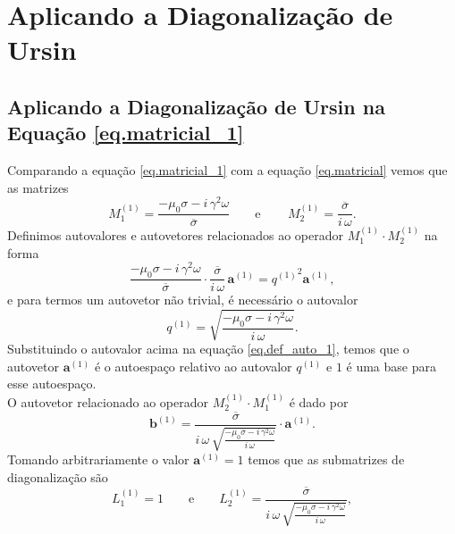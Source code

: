 \chapter{Aplicando a Diagonaliza\c{c}\~ao de Ursin}\label{sec.diagonalizacao_ursin}

   

\section{Aplicando a Diagonaliza\c{c}\~ao de Ursin na Equa\c{c}\~ao \ref{eq.matricial_1}}\label{sec.diagonalizacao_1}

Comparando a equa\c{c}\~ao \ref{eq.matricial_1} com a equa\c{c}\~ao \ref{eq.matricial} vemos que as matrizes
\begin{equation*}
M^{(1)}_1=\frac{-\mu_0\sigma-i\,\gamma^2\omega}{\overline{\sigma}}\qquad\text{e}\qquad\,M^{(1)}_2=\frac{\overline{\sigma}}{i\,\omega}.
\end{equation*}
Definimos autovalores e autovetores relacionados ao operador $M^{(1)}_1\cdot M^{(1)}_2$ na forma 
\begin{equation}\label{eq.def_auto_1}
\frac{-\mu_0\sigma-i\,\gamma^2\omega}{\overline{\sigma}}\cdot\frac{\overline{\sigma}}{i\,\omega}\,\mathbf{a}^{(1)}={q^{(1)}}^2\mathbf{a}^{(1)},
\end{equation}
e para termos um autovetor n\~ao trivial, \'e necess\'ario o autovalor
\begin{equation*}
q^{(1)}=\sqrt{\frac{-\mu_0\sigma-i\,\gamma^2\omega}{i\,\omega}}.
\end{equation*}
Substituindo o autovalor acima na equa\c{c}\~ao \ref{eq.def_auto_1}, temos que o autovetor $\mathbf{a}^{(1)}$ \'e o autoespa\c{c}o relativo ao autovalor $q^{(1)}$ e ${1}$ \'e uma base para esse autoespa\c{c}o.\\
O autovetor relacionado ao operador $M^{(1)}_2\cdot M^{(1)}_1$ \'e dado por
\begin{equation*}
\mathbf{b}^{(1)}=\frac{\overline{\sigma}}{i\,\omega\,\sqrt{\frac{-\mu_0\sigma-i\,\gamma^2\omega}{i\,\omega}}}\cdot\mathbf{a}^{(1)}.
\end{equation*}
Tomando arbitrariamente o valor $\mathbf{a}^{(1)}=1$ temos que as submatrizes de diagonaliza\c{c}\~ao s\~ao
\begin{equation*}
L^{(1)}_1=1\qquad\text{e}\qquad L^{(1)}_2=\frac{\overline{\sigma}}{i\,\omega\,\sqrt{\frac{-\mu_0\sigma-i\,\gamma^2\omega}{i\,\omega}}},
\end{equation*}
